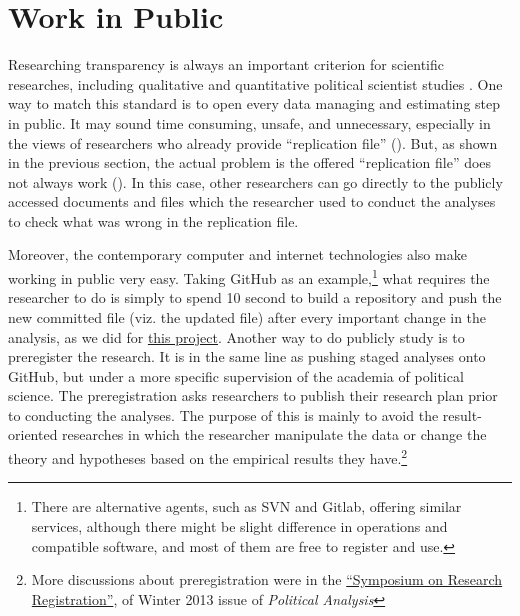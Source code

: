 
\section{Work in Public}

Researching transparency is always an important criterion for scientific researches, including qualitative and quantitative political scientist studies \citep{Appadurai2000,Denzin2009}. One way to match this standard is to open every data managing and estimating step in public. It may sound time consuming, unsafe, and unnecessary, especially in the views of researchers who already provide ``replication file'' (\cite[e.g., ][]{Newman2015}). But, as shown in the previous section, the actual problem is the offered ``replication file'' does not always work (\cite[e.g., again, ][]{Newman2015}). In this case, other researchers can go directly to the publicly accessed documents and files which the researcher used to conduct the analyses to check what was wrong in the replication file. 

Moreover, the contemporary computer and internet technologies also make working in public very easy. Taking GitHub as an example,\footnote{There are alternative agents, such as SVN and Gitlab, offering similar services, although there might be slight difference in operations and compatible software, and most of them are free to register and use.} what requires the researcher to do is simply to spend 10 second to build a repository and push the new committed file (viz. the updated file) after every important change in the analysis, as we did for \href{https://github.com/fsolt/meritocracy-rep}{this project}. Another way to do publicly study is to preregister the research. It is in the same line as pushing staged analyses onto GitHub, but under a more specific supervision of the academia of political science. The preregistration asks researchers to publish their research plan prior to conducting the analyses. The purpose of this is mainly to avoid the result-oriented researches in which the researcher manipulate the data or change the theory and hypotheses based on the empirical results they have.\footnote{More discussions about preregistration were in the \href{http://pan.oxfordjournals.org/content/21/1.toc}{``Symposium on Research Registration''}, of Winter 2013 issue of \textit{Political Analysis}}


